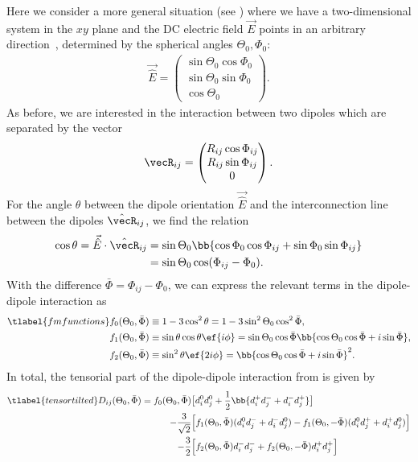 \noindent
Here we consider a more general situation (see ) where we have a two-dimensional system in the $xy$ plane and the DC electric field $\vec{E}$ points in an arbitrary direction~\cite{Gorshkov2011c}, determined by the spherical angles $\Theta_0, \Phi_0$:
\begin{align}
    \vec{\hat{E}}=\begin{pmatrix}
        \sin\Theta_0\cos\Phi_0 \\
        \sin\Theta_0\sin\Phi_0 \\
        \cos\Theta_0
    \end{pmatrix}.
\end{align}
As before, we are interested in the interaction between two dipoles which are separated
by the vector
\begin{align}
\vecR_{ij} = \begin{pmatrix}R_{ij} \cos\Phi_{ij} \\ R_{ij} \sin\Phi_{ij} \\ 0\end{pmatrix}.
\end{align}
For the angle $\theta$ between the dipole orientation $\vec{\hat{E}}$ and the interconnection line between the dipoles $\hat{\vecR}_{ij}$, we find the relation
\begin{align}
    \cos\theta = \vec{\hat{E}} \cdot \hat{\vecR}_{ij} &= \sin\Theta_0\bb{\cos\Phi_0\cos\Phi_{ij}+\sin\Phi_0\sin\Phi_{ij}}\\
                                                      &=\sin\Theta_0\cos(\Phi_{ij}-\Phi_0).
\end{align}
With the difference $\bar\Phi=\Phi_{ij}-\Phi_0$, we can express the relevant terms in the dipole-dipole interaction as
\begin{align} \tlabel{fmfunctions}
    f_0(\Theta_0, \bar \Phi)&\equiv 1-3\cos^2\theta = 1-3\sin^2\Theta_0\cos^2\bar\Phi, \\
    f_1(\Theta_0, \bar \Phi)&\equiv \sin\theta\cos\theta \ef{i\phi} = \sin\Theta_0 \cos\bar\Phi \bb{\cos\Theta_0 \cos\bar\Phi + i \sin \bar\Phi}, \\
    f_2(\Theta_0, \bar \Phi)&\equiv\sin^2\theta \ef{2i\phi} = \bb{\cos\Theta_0 \cos\bar\Phi + i \sin \bar\Phi}^2.
\end{align}
In total, the tensorial part of the dipole-dipole interaction from  is given by
\begin{align} \tlabel{tensortilted}
    D_{ij}(\Theta_0, \bar\Phi) = f_0(\Theta_0, \bar \Phi) &\big[ d_i^0 d_j^0 + \frac{1}{2}\bb{d_i^+ d_j^- + d_i^- d_j^+} \big] \\
      \qquad-\frac{3}{\sqrt{2}} &\Big[ f_1(\Theta_0, \bar \Phi)  (d_i^0 d_j^- + d_i^- d_j^0) - f_1(\Theta_0, -\bar \Phi) (d_i^0 d_j^+ + d_i^+ d_j^0) \Big]\\
      \qquad-\frac{3}{2} &\Big[ f_2(\Theta_0, \bar \Phi) d_i^- d_j^- + f_2(\Theta_0, -\bar \Phi) d_i^+ d_j^+\Big]
\end{align}
